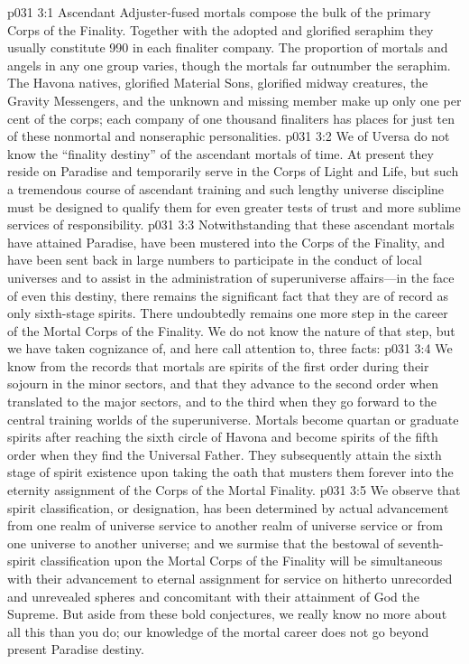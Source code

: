 \vs p031 3:1 Ascendant Adjuster\hyp{}fused mortals compose the bulk of the primary Corps of the Finality. Together with the adopted and glorified seraphim they usually constitute 990 in each finaliter company. The proportion of mortals and angels in any one group varies, though the mortals far outnumber the seraphim. The Havona natives, glorified Material Sons, glorified midway creatures, the Gravity Messengers, and the unknown and missing member make up only one per cent of the corps; each company of one thousand finaliters has places for just ten of these nonmortal and nonseraphic personalities.
\vs p031 3:2 We of Uversa do not know the “finality destiny” of the ascendant mortals of time. At present they reside on Paradise and temporarily serve in the Corps of Light and Life, but such a tremendous course of ascendant training and such lengthy universe discipline must be designed to qualify them for even greater tests of trust and more sublime services of responsibility.
\pc \vs p031 3:3 Notwithstanding that these ascendant mortals have attained Paradise, have been mustered into the Corps of the Finality, and have been sent back in large numbers to participate in the conduct of local universes and to assist in the administration of superuniverse affairs---in the face of even this  destiny, there remains the significant fact that they are of record as only sixth\hyp{}stage spirits. There undoubtedly remains one more step in the career of the Mortal Corps of the Finality. We do not know the nature of that step, but we have taken cognizance of, and here call attention to, three facts:
\pc \vs p031 3:4 \bibnobreakspace We know from the records that mortals are spirits of the first order during their sojourn in the minor sectors, and that they advance to the second order when translated to the major sectors, and to the third when they go forward to the central training worlds of the superuniverse. Mortals become quartan or graduate spirits after reaching the sixth circle of Havona and become spirits of the fifth order when they find the Universal Father. They subsequently attain the sixth stage of spirit existence upon taking the oath that musters them forever into the eternity assignment of the Corps of the Mortal Finality.\plusone
\vs p031 3:5 We observe that spirit classification, or designation, has been determined by actual advancement from one realm of universe service to another realm of universe service or from one universe to another universe; and we surmise that the bestowal of seventh\hyp{}spirit classification upon the Mortal Corps of the Finality will be simultaneous with their advancement to eternal assignment for service on hitherto unrecorded and unrevealed spheres and concomitant with their attainment of God the Supreme. But aside from these bold conjectures, we really know no more about all this than you do; our knowledge of the mortal career does not go beyond present Paradise destiny.
